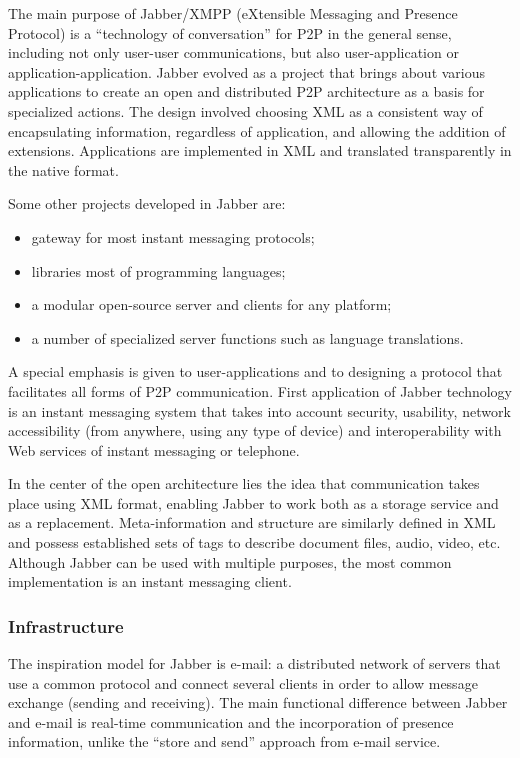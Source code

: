 The main purpose of Jabber/XMPP (eXtensible Messaging and Presence Protocol)
is a ``technology of conversation'' for P2P in the general sense, including
not only user-user communications, but also user-application or
application-application. Jabber evolved as a project that brings about various
applications to create an open and distributed P2P architecture as a basis for
specialized actions. The design involved choosing XML as a consistent way of
encapsulating information, regardless of application, and allowing the
addition of extensions. Applications are implemented in XML and translated
transparently in the native format.

Some other projects developed in Jabber are:
\begin{itemize}
  \item gateway for most instant messaging protocols;
  \item libraries most of programming languages;
  \item a modular open-source server and clients for any platform;
  \item a number of specialized server functions such as language translations.
\end{itemize}

A special emphasis is given to user-applications and to designing a protocol
that facilitates all forms of P2P communication. First application of Jabber
technology is an instant messaging system that takes into account security,
usability, network accessibility (from anywhere, using any type of device) and
interoperability with Web services of instant messaging or telephone.

In the center of the open architecture lies the idea that communication takes
place using XML format, enabling Jabber to work both as a storage service and
as a replacement. Meta-information and structure are similarly defined in XML
and possess established sets of tags to describe document files, audio, video,
etc. Although Jabber can be used with multiple purposes, the most common
implementation is an instant messaging client.

\subsubsection{Infrastructure}

The inspiration model for Jabber is e-mail: a distributed network of servers
that use a common protocol and connect several clients in order to allow
message exchange (sending and receiving). The main functional difference
between Jabber and e-mail is real-time communication and the incorporation of
presence information, unlike the ``store and send'' approach from e-mail
service.

